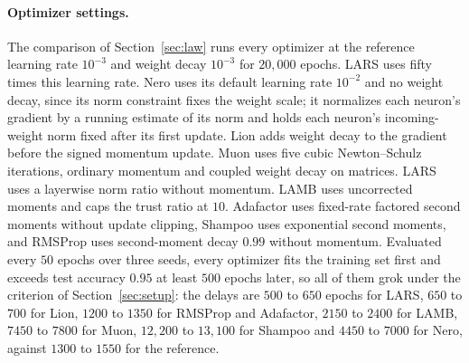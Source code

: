 \documentclass{article} %
\begin{document}
\paragraph{Optimizer settings.} The comparison of Section~\ref{sec:law} runs every optimizer at the reference learning rate $10^{-3}$ and weight decay $10^{-3}$ for $20{,}000$ epochs. LARS uses fifty times this learning rate. Nero uses its default learning rate $10^{-2}$ and no weight decay, since its norm constraint fixes the weight scale; it normalizes each neuron's gradient by a running estimate of its norm and holds each neuron's incoming-weight norm fixed after its first update. Lion adds weight decay to the gradient before the signed momentum update. Muon uses five cubic Newton--Schulz iterations, ordinary momentum and coupled weight decay on matrices. LARS uses a layerwise norm ratio without momentum. LAMB uses uncorrected moments and caps the trust ratio at $10$. Adafactor uses fixed-rate factored second moments without update clipping, Shampoo uses exponential second moments, and RMSProp uses second-moment decay $0.99$ without momentum. Evaluated every $50$ epochs over three seeds, every optimizer fits the training set first and exceeds test accuracy $0.95$ at least $500$ epochs later, so all of them grok under the criterion of Section~\ref{sec:setup}: the delays are $500$ to $650$ epochs for LARS, $650$ to $700$ for Lion, $1200$ to $1350$ for RMSProp and Adafactor, $2150$ to $2400$ for LAMB, $7450$ to $7800$ for Muon, $12{,}200$ to $13{,}100$ for Shampoo and $4450$ to $7000$ for Nero, against $1300$ to $1550$ for the reference.
\end{document}
